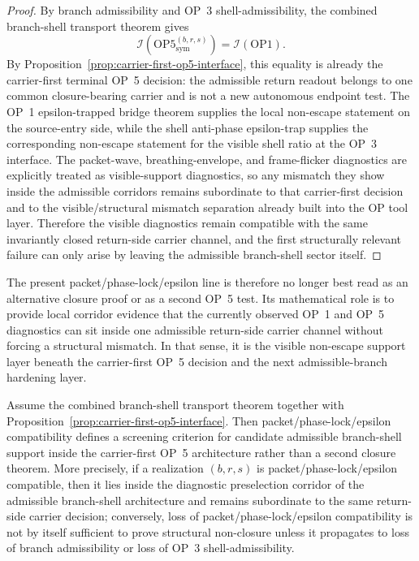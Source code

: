 \begin{proof}
By branch admissibility and OP~3 shell-admissibility, the combined branch-shell transport theorem gives
\[
\mathcal{I}(\mathrm{OP5}^{(b,r,s)}_{\mathrm{sym}})=\mathcal{I}(\mathrm{OP1}).
\]
By Proposition~\ref{prop:carrier-first-op5-interface}, this equality is already the carrier-first terminal OP~5 decision: the admissible return readout belongs to one common closure-bearing carrier and is not a new autonomous endpoint test. The OP~1 epsilon-trapped bridge theorem supplies the local non-escape statement on the source-entry side, while the shell anti-phase epsilon-trap supplies the corresponding non-escape statement for the visible shell ratio at the OP~3 interface. The packet-wave, breathing-envelope, and frame-flicker diagnostics are explicitly treated as visible-support diagnostics, so any mismatch they show inside the admissible corridors remains subordinate to that carrier-first decision and to the visible/structural mismatch separation already built into the OP tool layer. Therefore the visible diagnostics remain compatible with the same invariantly closed return-side carrier channel, and the first structurally relevant failure can only arise by leaving the admissible branch-shell sector itself.
\end{proof}

\begin{remark}
The present packet/phase-lock/epsilon line is therefore no longer best read as an alternative closure proof or as a second OP~5 test. Its mathematical role is to provide local corridor evidence that the currently observed OP~1 and OP~5 diagnostics can sit inside one admissible return-side carrier channel without forcing a structural mismatch. In that sense, it is the visible non-escape support layer beneath the carrier-first OP~5 decision and the next admissible-branch hardening layer.
\end{remark}

\begin{proposition}
\label{prop:packet-phase-epsilon-screening}
Assume the combined branch-shell transport theorem together with Proposition~\ref{prop:carrier-first-op5-interface}. Then packet/phase-lock/epsilon compatibility defines a screening criterion for candidate admissible branch-shell support inside the carrier-first OP~5 architecture rather than a second closure theorem. More precisely, if a realization $(b,r,s)$ is packet/phase-lock/epsilon compatible, then it lies inside the diagnostic preselection corridor of the admissible branch-shell architecture and remains subordinate to the same return-side carrier decision; conversely, loss of packet/phase-lock/epsilon compatibility is not by itself sufficient to prove structural non-closure unless it propagates to loss of branch admissibility or loss of OP~3 shell-admissibility.
\end{proposition}

